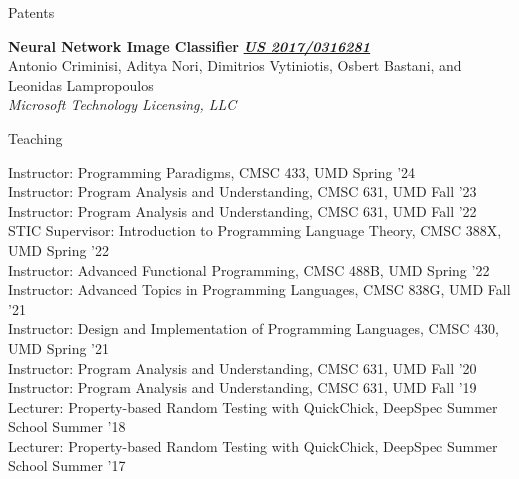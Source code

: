 \documentclass{resume} %
\begin{document}

\begin{rSection}{Patents}

{\bf Neural Network Image Classifier} \hfill {\href{https://patentimages.storage.googleapis.com/44/ec/9f/3f90c94a602fda/US20170316281A1.pdf}{\bf \em US 2017/0316281}}\\
Antonio Criminisi, Aditya Nori, Dimitrios Vytiniotis, Osbert Bastani, and Leonidas Lampropoulos\\
{\em Microsoft Technology Licensing, LLC}

  
\end{rSection}


\newcommand{\teach}[3]{
  {#1: #2} \hfill #3 \\
  }

\begin{rSection}{Teaching}

  \teach{Instructor}{Programming Paradigms, CMSC 433, UMD}{Spring '24}
  \teach{Instructor}{Program Analysis and Understanding, CMSC 631, UMD}{Fall '23}    
  \teach{Instructor}{Program Analysis and Understanding, CMSC 631, UMD}{Fall '22}  
  \teach{STIC Supervisor}{Introduction to Programming Language Theory, CMSC 388X, UMD}{Spring '22}  
  \teach{Instructor}{Advanced Functional Programming, CMSC 488B, UMD}{Spring '22}  
  \teach{Instructor}{Advanced Topics in Programming Languages, CMSC 838G, UMD}{Fall '21}
  \teach{Instructor}{Design and Implementation of Programming Languages, CMSC 430, UMD}{Spring '21}  
  \teach{Instructor}{Program Analysis and Understanding, CMSC 631, UMD}{Fall '20}
  \teach{Instructor}{Program Analysis and Understanding, CMSC 631, UMD}{Fall '19}
  \teach{Lecturer}{Property-based Random Testing with QuickChick, DeepSpec Summer School}{Summer '18}
  \teach{Lecturer}{Property-based Random Testing with QuickChick, DeepSpec Summer School}{Summer '17}  
  
\end{rSection}
\end{document}
